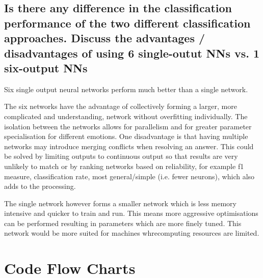 \documentclass[11pt]{article}
\begin{document}
\subsection{Is there any difference in the classification performance of the two different classification approaches. Discuss the advantages / disadvantages of using 6 single-outut NNs vs. 1 six-output NNs}

Six single output neural networks perform much better than a single network. 

The six networks have the advantage of collectively forming a larger, more complicated and understanding, network without overfitting individually. The isolation between the networks allows for parallelism and for greater parameter specialisation for different emotions. One disadvantage is that having multiple networks may introduce merging conflicts when resolving an answer. This could be solved by limiting outputs to continuous output so that results are very unlikely to match or by ranking networks based on reliability, for example f1 measure, classification rate, most general/simple (i.e. fewer neurons), which also adds to the processing.

The single network however forms a smaller network which is less memory intensive and quicker to train and run. This means more aggressive optimisations can be performed resulting in parameters which are more finely tuned. This network would be more suited for machines whrecomputing resources are limited.

\section{Code Flow Charts}
\end{document}
